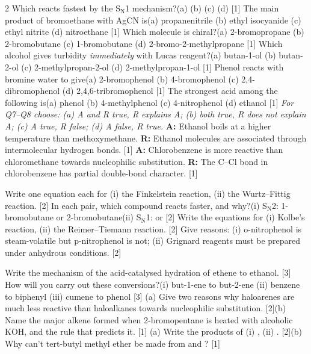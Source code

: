 \documentclass[10pt,a4paper]{extarticle}
\newcommand{\mk}[1]{{\scriptsize\color{black!55}[#1]}}
\begin{document}
\begin{multicols}{2}\raggedcolumns
{}
\Q Which reacts fastest by the S$_\text{N}$1 mechanism?\nl (a)  \quad (b)  \quad (c)  \quad (d)  \mk{1}
\Q The main product of bromoethane with AgCN is\nl (a) propanenitrile \quad (b) ethyl isocyanide \quad (c) ethyl nitrite \quad (d) nitroethane \mk{1}
\Q Which molecule is chiral?\nl (a) 2-bromopropane \quad (b) 2-bromobutane \quad (c) 1-bromobutane \quad (d) 2-bromo-2-methylpropane \mk{1}
\Q Which alcohol gives turbidity \emph{immediately} with Lucas reagent?\nl (a) butan-1-ol \quad (b) butan-2-ol \quad (c) 2-methylpropan-2-ol \quad (d) 2-methylpropan-1-ol \mk{1}
\Q Phenol reacts with bromine water to give\nl (a) 2-bromophenol \quad (b) 4-bromophenol \quad (c) 2,4-dibromophenol \quad (d) 2,4,6-tribromophenol \mk{1}
\Q The strongest acid among the following is\nl (a) phenol \quad (b) 4-methylphenol \quad (c) 4-nitrophenol \quad (d) ethanol \mk{1}
\nl\textit{For Q7--Q8 choose: (a) A and R true, R explains A; (b) both true, R does not explain A; (c) A true, R false; (d) A false, R true.}
\Q \textbf{A:} Ethanol boils at a higher temperature than methoxymethane. \textbf{R:} Ethanol molecules are associated through intermolecular hydrogen bonds. \mk{1}
\Q \textbf{A:} Chlorobenzene is more reactive than chloromethane towards nucleophilic substitution. \textbf{R:} The C--Cl bond in chlorobenzene has partial double-bond character. \mk{1}

\Q Write one equation each for (i) the Finkelstein reaction, (ii) the Wurtz--Fittig reaction. \mk{2}
\Q In each pair, which compound reacts faster, and why?\nl (i) S$_\text{N}$2: 1-bromobutane or 2-bromobutane\nl (ii) S$_\text{N}$1:  or  \mk{2}
\Q Write the equations for (i) Kolbe's reaction, (ii) the Reimer--Tiemann reaction. \mk{2}
\Q Give reasons: (i) o-nitrophenol is steam-volatile but p-nitrophenol is not; (ii) Grignard reagents must be prepared under anhydrous conditions. \mk{2}

\Q Write the mechanism of the acid-catalysed hydration of ethene to ethanol. \mk{3}
\Q How will you carry out these conversions?\nl (i) but-1-ene to but-2-ene \quad (ii) benzene to biphenyl \quad (iii) cumene to phenol \mk{3}
\Q (a) Give two reasons why haloarenes are much less reactive than haloalkanes towards nucleophilic substitution. \mk{2}\nl (b) Name the major alkene formed when 2-bromopentane is heated with alcoholic KOH, and the rule that predicts it. \mk{1}
\Q (a) Write the products of (i) , (ii) . \mk{2}\nl (b) Why can't tert-butyl methyl ether be made from  and ? \mk{1}


\end{multicols}
\end{document}
